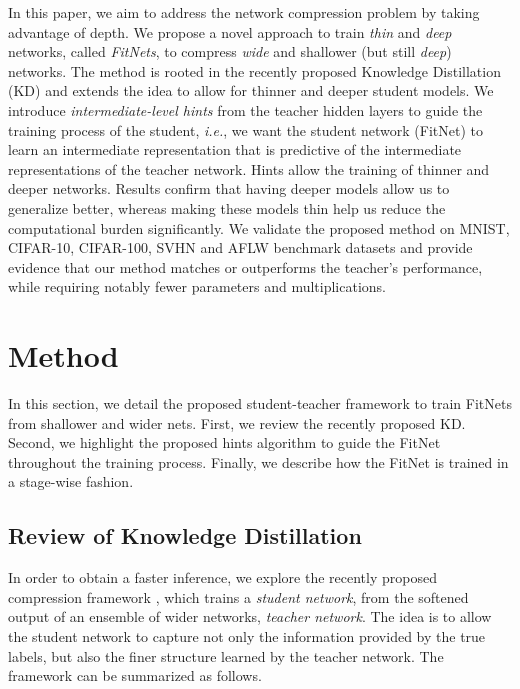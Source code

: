 \documentclass{article} %
\begin{document}
In this paper, we aim to address the network compression problem by taking
advantage of depth. We propose a novel approach to train \emph{thin} and \emph{deep} networks, called \emph{FitNets}, to compress  \emph{wide} and shallower (but still \emph{deep}) networks. The method
is rooted in the recently proposed Knowledge Distillation (KD) \citep{Hinton14} and extends the
idea to allow for thinner and deeper student models. We introduce
\emph{intermediate-level hints} from the teacher hidden layers to guide the training process of the student,
\textit{i.e.}, we want the student network (FitNet) to learn an intermediate representation
that is predictive of the intermediate representations of the teacher network. Hints allow the training
of thinner and deeper networks. Results
confirm that having deeper models allow us to generalize better, whereas
making these models thin help us reduce the computational burden
significantly.  We validate the proposed method on MNIST, CIFAR-10, CIFAR-100, SVHN and AFLW benchmark datasets and provide evidence that our method matches or
outperforms the teacher's performance, while requiring notably fewer
parameters and multiplications.

\vspace*{-1mm}
\section{Method}
\label{sec:method}
\vspace*{-1mm}

In this section, we detail the proposed student-teacher framework to train FitNets from shallower and wider nets. First, we review the recently
proposed KD. Second, we highlight the proposed hints algorithm to guide the
FitNet throughout the training process. Finally, we describe how the
FitNet is trained in a stage-wise fashion.

\vspace*{-1mm}
\subsection{Review of Knowledge Distillation}
\vspace*{-1mm}

In order to obtain a faster inference, we explore the recently proposed compression framework \citep{Hinton14}, which trains a \textit{student
  network}, from the softened output of an ensemble of wider networks,
\textit{teacher network}. The idea is to allow the student network to capture
not only the information provided by the true labels, but also the finer structure
learned by the teacher network. The framework can be
summarized as follows.
\end{document}
